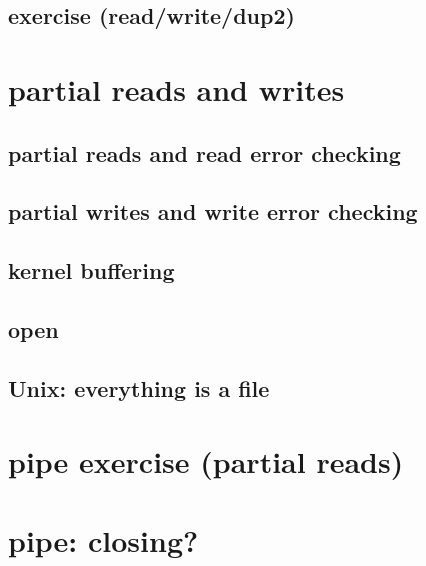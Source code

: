 


\subsection{exercise (read/write/dup2)}



\section{partial reads and writes}
\subsection{partial reads and read error checking}

\subsection{partial writes and write error checking}


\subsection{kernel buffering}



\subsection{open}



\subsection{Unix: everything is a file}



\section{pipe exercise (partial reads)}


\section{pipe: closing?}


